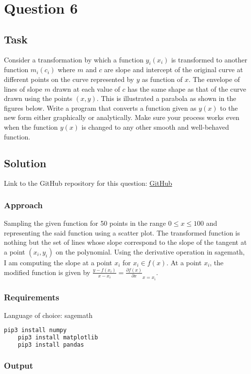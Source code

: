\section{Question 6}

\subsection{Task}
Consider a transformation by which a function $y_i\left(x_i\right)$ is transformed to another function $m_i\left(c_i\right)$  where $m$ and $c$ are slope and intercept of the original curve at different points on the curve represented by $y$ as function of $x$. The envelope of lines of slope $m$ drawn at each value of $c$ has the same shape as that of the curve drawn using the points $\left(x,y\right)$. This is illustrated a parabola as shown in the figures below. Write a program that converts a function given as $y\left(x\right)$ to the new form either graphically or analytically. Make sure your process works even when the function $y\left(x\right)$ is changed to any other smooth and well-behaved function.

\subsection{Solution}

Link to the GitHub repository for this question: \href{https://github.com/Xerefic/MM2090-Solutions/tree/master/Final_Assignment/question_6}{GitHub}

\subsubsection{Approach}
Sampling the given function for 50 points in the range $0 \leq x \leq 100$ and representing the said function using a scatter plot. The transformed function is nothing but the set of lines whose slope correspond to the slope of the tangent at a point $\left(x_i,y_i\right)$ on the polynomial. Using the derivative operation in sagemath, I am computing the slope at a point $x_i$ for $x_i \in f(x)$. At a point $x_i$, the modified function is given by $\frac{y-f(x_i)}{x-x_i}=\frac{\partial f(x)}{\partial x}_{x=x_i}$. 

\subsubsection{Requirements}
Language of choice: sagemath
\begin{lstlisting}[language=bash]
	pip3 install numpy
	pip3 install matplotlib
	pip3 install pandas
\end{lstlisting}

\subsubsection{Output}


